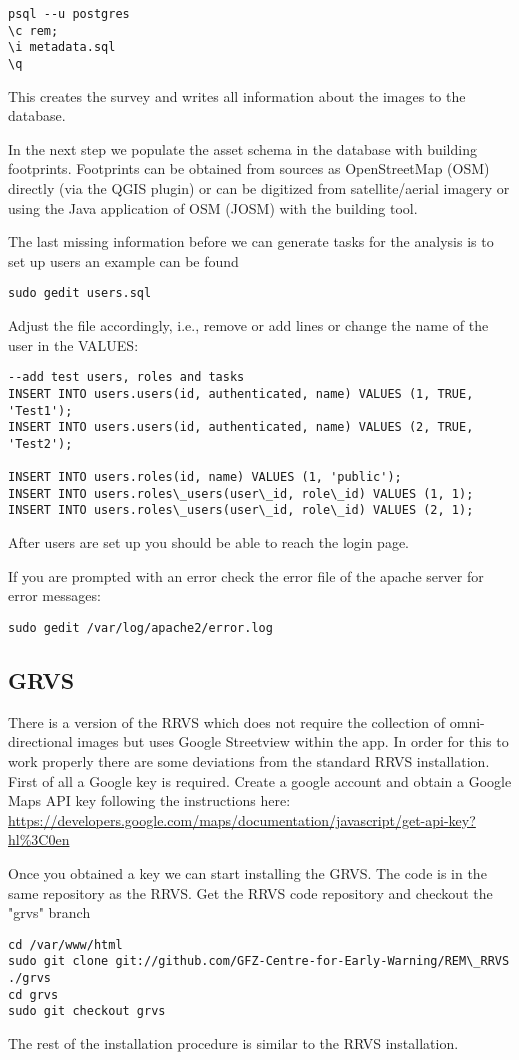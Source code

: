 \documentclass{article}
\begin{document}
\begin{verbatim}
psql --u postgres
\c rem;
\i metadata.sql
\q
\end{verbatim}
This creates the survey and writes all information about the images 
to the database.

In the next step we populate the asset schema in the database 
with building footprints. Footprints can be obtained from
sources as OpenStreetMap (OSM) directly (via the QGIS plugin)
 or can be digitized from 
satellite/aerial imagery or using the Java application of OSM
(JOSM) with the building tool.


The last missing information before we can generate tasks
for the analysis is to set up users an example can be found
\begin{verbatim}
sudo gedit users.sql
\end{verbatim}

Adjust the file accordingly, i.e., remove or add lines or change the
name of the user in the VALUES: 
\begin{verbatim}
--add test users, roles and tasks
INSERT INTO users.users(id, authenticated, name) VALUES (1, TRUE, 'Test1');
INSERT INTO users.users(id, authenticated, name) VALUES (2, TRUE, 'Test2');

INSERT INTO users.roles(id, name) VALUES (1, 'public');
INSERT INTO users.roles\_users(user\_id, role\_id) VALUES (1, 1);
INSERT INTO users.roles\_users(user\_id, role\_id) VALUES (2, 1);
\end{verbatim}


After users are set up you should be able to reach the login
page.

If you are prompted with an error check the error file of the apache
server for error messages:

\begin{verbatim}
sudo gedit /var/log/apache2/error.log
\end{verbatim}

\subsection{GRVS}
There is a version of the RRVS which does not require the
collection of omni-directional images but uses Google Streetview
within the app. In order for this to work properly there
are some deviations from the standard RRVS installation.
First of all a Google key is required.
Create a google account and obtain a Google Maps API key
following the instructions here:
\url{https://developers.google.com/maps/documentation/javascript/get-api-key?hl%3C0en}

Once you obtained a key we can start installing the GRVS.
The code is in the same repository as the RRVS.
Get the RRVS code repository and checkout the "grvs" branch 

\begin{verbatim}
cd /var/www/html
sudo git clone git://github.com/GFZ-Centre-for-Early-Warning/REM\_RRVS ./grvs
cd grvs
sudo git checkout grvs
\end{verbatim}

The rest of the installation procedure is similar to the RRVS 
installation. 
\end{document}
